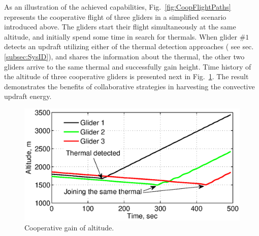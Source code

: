 \documentclass{ifacconf}
\newcommand{\squeezeup}{\vspace{-3.0mm}}
\begin{document}
As an illustration of the achieved capabilities,
Fig.~\ref{fig:CoopFlightPaths} represents the cooperative flight of three
gliders in a simplified scenario introduced above. The gliders start their
flight simultaneously at the same altitude, and initially spend some time in
search for thermals. When glider $\#1$ detects an updraft utilizing either of
the thermal detection approaches ( see sec.\ref{subsec:SysID}), and shares
the information about the thermal, the other two gliders arrive to the same
thermal and successfully gain height. Time history of the altitude of three
cooperative gliders is presented next in Fig.~\ref{fig:CoopFlightHeight}. The
result demonstrates the benefits of collaborative strategies in harvesting the
convective updraft energy.
\begin{figure}[thpb]
  \centering
  \includegraphics[scale=0.39]{Figures/Coop_gain_altitude_2.eps}
  \caption{Cooperative gain of altitude.}
  \label{fig:CoopFlightHeight}
\end{figure}
\squeezeup

\end{document}
